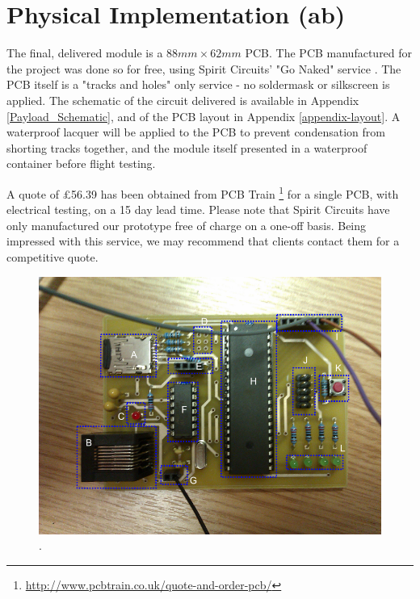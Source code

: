 \section{Physical Implementation (ab)}
\label{sec:PCB-implementation}

The final, delivered module is a $88mm\times62mm$ PCB. The PCB manufactured 
for the project was done so for free, using Spirit Circuits' "Go Naked"
service \cite{go-naked}. The PCB itself is a "tracks and holes" only service 
- no soldermask or silkscreen is applied. The schematic of the circuit 
delivered is available in Appendix \ref{Payload_Schematic}, and of the PCB layout in Appendix 
\ref{appendix-layout}. A waterproof lacquer will be applied to the PCB to prevent condensation 
from shorting tracks together, and the module itself presented in a 
waterproof container before flight testing.

A quote of \pounds 56.39 has been obtained from PCB Train \footnote{\url{http://www.pcbtrain.co.uk/quote-and-order-pcb/}} 
for a single PCB, with electrical testing, on a 15 day lead time. 
Please note that Spirit Circuits have only manufactured our prototype 
free of charge on a one-off basis. Being impressed with this service, 
we may recommend that clients contact them for a competitive quote.

\begin{figure}[H]
        \centering
        \includegraphics[width=1.00\textwidth]{figures/PayloadImplementation.png}
        . 
        \label{fig:PayloadImplementation}
\end{figure}

